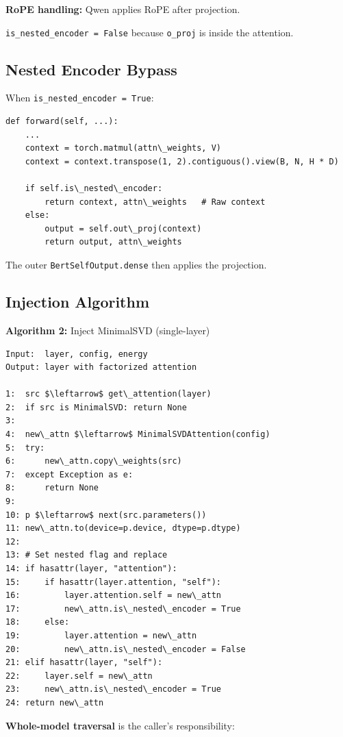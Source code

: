 \textbf{RoPE handling:} Qwen applies RoPE after projection.

\texttt{is\_nested\_encoder = False} because \texttt{o\_proj} is inside the attention.

\subsection{Nested Encoder Bypass}

When \texttt{is\_nested\_encoder = True}:

\begin{lstlisting}
def forward(self, ...):
    ...
    context = torch.matmul(attn\_weights, V)
    context = context.transpose(1, 2).contiguous().view(B, N, H * D)
    
    if self.is\_nested\_encoder:
        return context, attn\_weights   # Raw context
    else:
        output = self.out\_proj(context)
        return output, attn\_weights
\end{lstlisting}

The outer \texttt{BertSelfOutput.dense} then applies the projection.

\subsection{Injection Algorithm}

\textbf{Algorithm 2:} Inject MinimalSVD (single-layer)
\begin{lstlisting}
Input:  layer, config, energy  
Output: layer with factorized attention

1:  src $\leftarrow$ get\_attention(layer)
2:  if src is MinimalSVD: return None
3:
4:  new\_attn $\leftarrow$ MinimalSVDAttention(config)
5:  try:
6:      new\_attn.copy\_weights(src)
7:  except Exception as e:
8:      return None
9:
10: p $\leftarrow$ next(src.parameters())
11: new\_attn.to(device=p.device, dtype=p.dtype)
12:
13: # Set nested flag and replace
14: if hasattr(layer, "attention"):
15:     if hasattr(layer.attention, "self"):
16:         layer.attention.self = new\_attn
17:         new\_attn.is\_nested\_encoder = True
18:     else:
19:         layer.attention = new\_attn
20:         new\_attn.is\_nested\_encoder = False
21: elif hasattr(layer, "self"):
22:     layer.self = new\_attn
23:     new\_attn.is\_nested\_encoder = True
24: return new\_attn
\end{lstlisting}

\textbf{Whole-model traversal} is the caller's responsibility:

